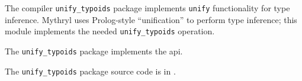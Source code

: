 
The compiler {\tt unify\_typoids} package implements {\tt unify} functionality 
for type inference.  Mythryl uses Prolog-style ``unification'' to perform type 
inference;  this module implements the needed {\tt unify\_typoids} operation. 

The {\tt unify\_typoids} package implements the  api.

The {\tt unify\_typoids} package source code is in .

